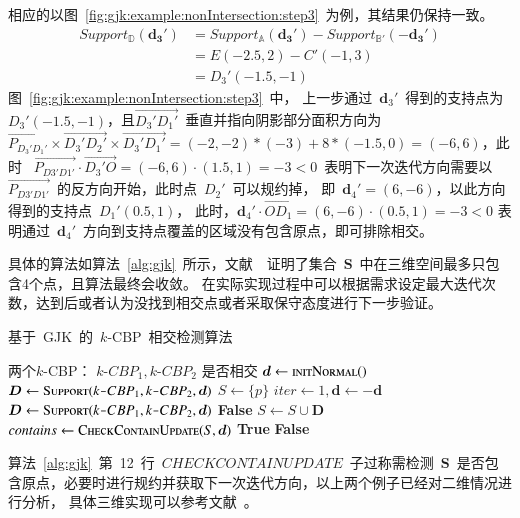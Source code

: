 相应的以图~\ref{fig:gjk:example:nonIntersection:step3}~为例，其结果仍保持一致。
\begin{equation}
  \begin{array}{ll}
  Support_\mathbb{D}(\bm{d_3'})  & = Support_\mathbb{A}(\bm{d_3'}) - Support_\mathbb{B'}(-\bm{d_3'}) \\
    & = E(-2.5, 2) - C'(-1, 3) \\
    & = D_3'(-1.5, -1) 
  \end{array}
\end{equation}
图~\ref{fig:gjk:example:nonIntersection:step3}~中，
上一步通过~$\bm{d}_3'$~得到的支持点为~$D_3'(-1.5, -1)$，且$\overrightarrow{D_3'D_1'}$~垂直并指向阴影部分面积方向为~$\overrightarrow{P_{D_3'D_1'}}
\times \overrightarrow{D_3'D_2'} \times \overrightarrow{D_3'D_1'} =
(-2,-2)*(-3) + 8*(-1.5, 0) = (-6, 6)$，此时
~$\overrightarrow{P_{D3'D1'}} \cdot \overrightarrow{D_3'O} = (-6, 6) \cdot (1.5, 1) = -3 < 0$~表明下一次迭代方向需要以~$\overrightarrow{P_{D3'D1'}}$~的反方向开始，此时点~$D_2'$~可以规约掉，
即~$\bm{d}_4'= (6, -6)$，以此方向得到的支持点~$D_1'(0.5, 1)$，
此时，$\bm{d}_4' \cdot \overrightarrow{OD_1} = (6, -6) \cdot (0.5, 1) = -3 < 0 $ 表明通过~$\bm{d}_4'$~方向到支持点覆盖的区域没有包含原点，即可排除相交。

具体的算法如算法~\ref{alg:gjk}~所示，文献~~证明了集合~$\bm{S}$~中在三维空间最多只包含4个点，且算法最终会收敛。
在实际实现过程中可以根据需求设定最大迭代次数，达到后或者认为没找到相交点或者采取保守态度进行下一步验证。

\begin{algorithm}[H]
\small
\caption{基于~GJK~的~$k$-CBP~相交检测算法}
\label{alg:gjk}
\begin{algorithmic}[1]
\Require
两个$k$-CBP： $k\texttt{-}CBP_1, k\texttt{-}CBP_2$
\Ensure
是否相交
    \State $\bm{d} \gets \Call{initNormal}$
    \State $\bm{D} \gets \Call{Support}{k\texttt{-}CBP_1, k\texttt{-}CBP_2, \bm{d}}$
    \State $S \gets \{p\}$
    \State $iter \gets 1 , \bm{d} \gets -\bm{d}$
        \State $\bm{D} \gets \Call{Support}{k\texttt{-}CBP_1, k\texttt{-}CBP_2, \bm{d}}$
            \State \Return \textbf{False}
        \EndIf
        \State $S \gets S \cup \bm{D}$
        \State $ contains \gets \Call{CheckContainUpdate}{S, \bm{d}}$ 
            \State \Return \textbf{True} 
        \EndIf
    \EndWhile
    \State \Return \textbf{False} 
\EndFunction
\end{algorithmic}
\end{algorithm}
算法~\ref{alg:gjk}~第~12~行~$CHECKCONTAINUPDATE$~子过称需检测~$\bm{S}$~是否包含原点，必要时进行规约并获取下一次迭代方向，以上两个例子已经对二维情况进行分析，
具体三维实现可以参考文献~。

